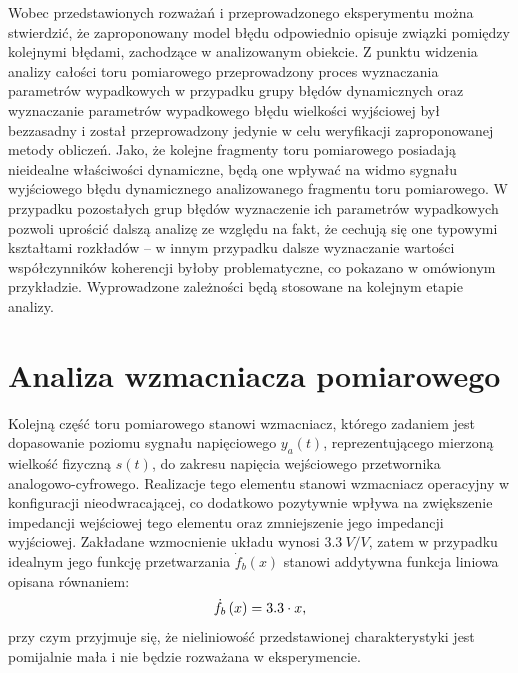 Wobec przedstawionych rozważań i przeprowadzonego eksperymentu można stwierdzić, że zaproponowany model błędu odpowiednio opisuje związki pomiędzy kolejnymi błędami, zachodzące w analizowanym obiekcie. Z punktu widzenia analizy całości toru pomiarowego przeprowadzony proces wyznaczania parametrów wypadkowych w przypadku grupy błędów dynamicznych oraz wyznaczanie parametrów wypadkowego błędu wielkości wyjściowej był bezzasadny i został przeprowadzony jedynie w celu weryfikacji zaproponowanej metody obliczeń. Jako, że kolejne fragmenty toru pomiarowego posiadają nieidealne właściwości dynamiczne, będą one wpływać na widmo sygnału wyjściowego błędu dynamicznego analizowanego fragmentu toru pomiarowego. W przypadku pozostałych grup błędów wyznaczenie ich parametrów wypadkowych pozwoli uprościć dalszą analizę ze względu na fakt, że cechują się one typowymi kształtami rozkładów -- w innym przypadku dalsze wyznaczanie wartości współczynników koherencji byłoby problematyczne, co pokazano w omówionym przykładzie. Wyprowadzone zależności będą stosowane na kolejnym etapie analizy.

\section{Analiza wzmacniacza pomiarowego}

Kolejną część toru pomiarowego stanowi wzmacniacz, którego zadaniem jest dopasowanie poziomu sygnału napięciowego $y_{a}(t)$, reprezentującego mierzoną wielkość fizyczną $s(t)$, do zakresu napięcia wejściowego przetwornika analogowo-cyfrowego. Realizacje tego elementu stanowi wzmacniacz operacyjny w konfiguracji nieodwracającej, co dodatkowo pozytywnie wpływa na zwiększenie impedancji wejściowej tego elementu oraz zmniejszenie jego impedancji wyjściowej. Zakładane wzmocnienie układu wynosi $\qty{3.3}{V \per V}$, zatem w przypadku idealnym jego funkcję przetwarzania $\dot{f}_{b}(x)$ stanowi addytywna funkcja liniowa opisana równaniem:
\begin{equation}
\dot{f}_{b} \left(x\right) = 3.3 \cdot x \label{eq:sym_partb_function},
\end{equation}
przy czym przyjmuje się, że nieliniowość przedstawionej charakterystyki jest pomijalnie mała i nie będzie rozważana w eksperymencie.

